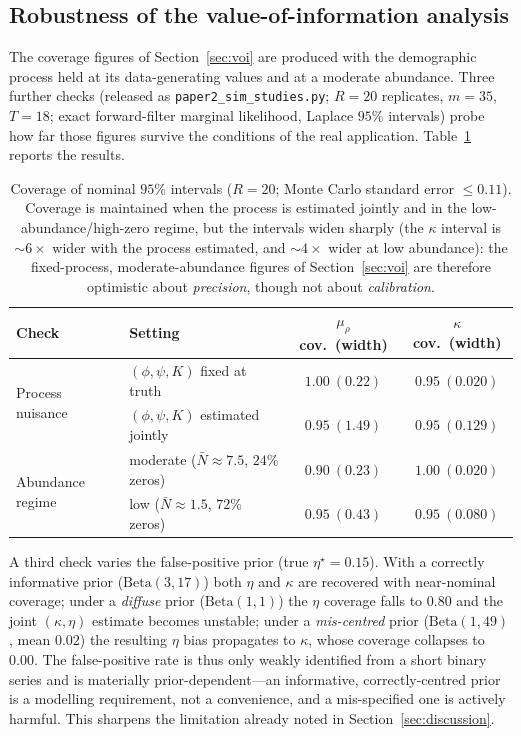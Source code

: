 \documentclass[preprint,12pt]{elsarticle}
\theoremstyle{definition}
\begin{document}
\subsection{Robustness of the value-of-information analysis}
\label{app:robust}

The coverage figures of Section~\ref{sec:voi} are produced with the demographic
process held at its data-generating values and at a moderate abundance. Three
further checks (released as \texttt{paper2\_sim\_studies.py}; $R=20$ replicates,
$m=35$, $T=18$; exact forward-filter marginal likelihood, Laplace $95\%$
intervals) probe how far those figures survive the conditions of the real
application. Table~\ref{tab:robust} reports the results.

\begin{table}[h!]
\centering\small\renewcommand{\arraystretch}{1.2}
\begin{tabular}{llcc}
\toprule
\textbf{Check} & \textbf{Setting} & $\mu_\rho$ cov.\ (width) & $\kappa$ cov.\ (width)\\
\midrule
\multirow{2}{*}{Process nuisance}
 & $(\phi,\psi,K)$ fixed at truth & $1.00\ (0.22)$ & $0.95\ (0.020)$\\
 & $(\phi,\psi,K)$ estimated jointly & $0.95\ (1.49)$ & $0.95\ (0.129)$\\
\midrule
\multirow{2}{*}{Abundance regime}
 & moderate ($\bar N\!\approx\!7.5$, $24\%$ zeros) & $0.90\ (0.23)$ & $1.00\ (0.020)$\\
 & low ($\bar N\!\approx\!1.5$, $72\%$ zeros)      & $0.95\ (0.43)$ & $0.95\ (0.080)$\\
\bottomrule
\end{tabular}
\caption{Coverage of nominal $95\%$ intervals ($R=20$; Monte Carlo standard
error $\le0.11$). Coverage is maintained when the process is estimated jointly
and in the low-abundance/high-zero regime, but the intervals widen sharply
(the $\kappa$ interval is $\sim\!6\times$ wider with the process estimated, and
$\sim\!4\times$ wider at low abundance): the fixed-process, moderate-abundance
figures of Section~\ref{sec:voi} are therefore optimistic about \emph{precision},
though not about \emph{calibration}.}
\label{tab:robust}
\end{table}

A third check varies the false-positive prior (true $\eta^\star=0.15$). With a
correctly informative prior ($\mathrm{Beta}(3,17)$) both $\eta$ and $\kappa$ are
recovered with near-nominal coverage; under a \emph{diffuse} prior
($\mathrm{Beta}(1,1)$) the $\eta$ coverage falls to $0.80$ and the joint
$(\kappa,\eta)$ estimate becomes unstable; under a \emph{mis-centred} prior
($\mathrm{Beta}(1,49)$, mean $0.02$) the resulting $\eta$ bias propagates to
$\kappa$, whose coverage collapses to $0.00$. The false-positive rate is thus
only weakly identified from a short binary series and is materially
prior-dependent---an informative, correctly-centred prior is a modelling
requirement, not a convenience, and a mis-specified one is actively harmful. This
sharpens the limitation already noted in Section~\ref{sec:discussion}.
\end{document}
